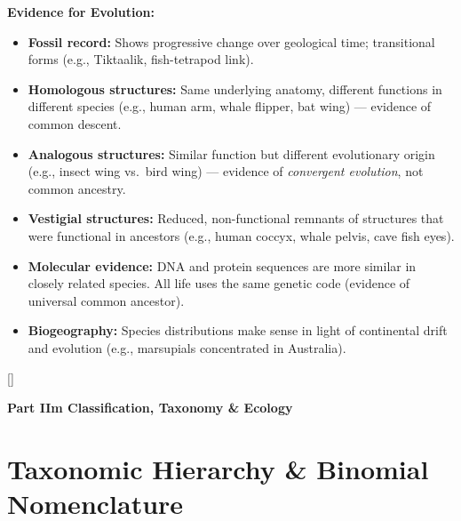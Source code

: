 \documentclass[11pt, letterpaper]{article}
\newcommand{\bluesections}{%
  \titleformat{\section}{\large\bfseries\color{sectionblue}}{}{0em}{}[\color{sectionblue}\titlerule]%
  \titleformat{\subsection}{\normalsize\bfseries\color{sectionblue!80!black}}{}{0em}{}%
}
\newcommand{\partbanner}[3]{%
  \begin{tcolorbox}[colback=#1, colframe=#2, boxrule=1.2pt, arc=4pt,
    left=8pt, right=8pt, top=6pt, bottom=6pt]
    \begin{center}{\LARGE\bfseries #3}\end{center}
  \end{tcolorbox}%
}
\begin{document}
\vspace{6pt}
\textbf{Evidence for Evolution:}
\begin{itemize}[noitemsep]
  \item \textbf{Fossil record:} Shows progressive change over geological time; transitional forms (e.g., Tiktaalik, fish-tetrapod link).
  \item \textbf{Homologous structures:} Same underlying anatomy, different functions in different species (e.g., human arm, whale flipper, bat wing) --- evidence of common descent.
  \item \textbf{Analogous structures:} Similar function but different evolutionary origin (e.g., insect wing vs.\ bird wing) --- evidence of \emph{convergent evolution}, not common ancestry.
  \item \textbf{Vestigial structures:} Reduced, non-functional remnants of structures that were functional in ancestors (e.g., human coccyx, whale pelvis, cave fish eyes).
  \item \textbf{Molecular evidence:} DNA and protein sequences are more similar in closely related species. All life uses the same genetic code (evidence of universal common ancestor).
  \item \textbf{Biogeography:} Species distributions make sense in light of continental drift and evolution (e.g., marsupials concentrated in Australia).
\end{itemize}

\newpage

\bluesections
{}
\partbanner{partbg}{sectionblue}{Part IIm \quad Classification, Taxonomy \& Ecology}

\vspace{8pt}

\section*{Taxonomic Hierarchy \& Binomial Nomenclature}
\end{document}
